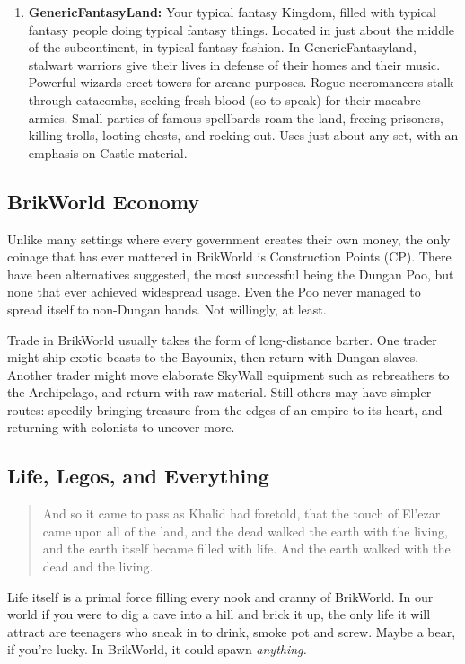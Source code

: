 \documentclass[12pt,a4paper,twocolumn]{article}
\begin{document}
\begin{enumerate}
\item {\bf GenericFantasyLand:} Your typical fantasy Kingdom, filled with typical fantasy people doing typical fantasy things.  Located in just about the middle of the subcontinent, in typical fantasy fashion.  In GenericFantasyland, stalwart warriors give their lives in defense of their homes and their music.  Powerful wizards erect towers for arcane purposes.  Rogue necromancers stalk through catacombs, seeking fresh blood (so to speak) for their macabre armies.  Small parties of famous spellbards roam the land, freeing prisoners, killing trolls, looting chests, and rocking out.  Uses just about any set, with an emphasis on Castle material.

\end{enumerate}

\subsection{BrikWorld Economy}

Unlike many settings where every government creates their own money, the only coinage that has ever mattered in BrikWorld is Construction Points (CP).  There have been alternatives suggested, the most successful being the Dungan Poo, but none that ever achieved widespread usage.  Even the Poo never managed to spread itself to non-Dungan hands.  Not willingly, at least.

Trade in BrikWorld usually takes the form of long-distance barter.  One trader might ship exotic beasts to the Bayounix, then return with Dungan slaves.  Another trader might move elaborate SkyWall equipment such as rebreathers to the Archipelago, and return with raw material.  Still others may have simpler routes: speedily bringing treasure from the edges of an empire to its heart, and returning with colonists to uncover more.

\subsection{Life, Legos, and Everything}
\begin{quote}
And so it came to pass as Khalid had foretold, that the touch of El'ezar came upon all of the land, and the dead walked the earth with the living, and the earth itself became filled with life.  And the earth walked with the dead and the living.
\end{quote}

Life itself is a primal force filling every nook and cranny of BrikWorld.  In our world if you were to dig a cave into a hill and brick it up, the only life it will attract are teenagers who sneak in to drink, smoke pot and screw.  Maybe a bear, if you're lucky.  In BrikWorld, it could spawn {\em anything.}  
\end{document}
